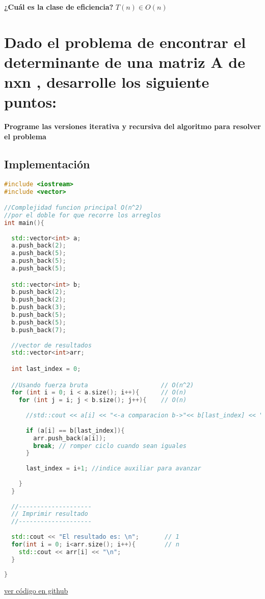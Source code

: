 \documentclass{article}
\begin{document}
\begin{question}
  \textbf{¿Cuál es la clase de eficiencia?}
  \textit{$T(n) \in O(n)$}
    
\end{question}

\newpage
\section{Dado el problema de encontrar el determinante de una matriz A de nxn , desarrolle los siguiente puntos:}

\begin{question}
  \textbf{Programe las versiones iterativa y recursiva del algoritmo para resolver el problema}
\end{question}

\subsection{Implementación}
\begin{file}
\begin{lstlisting}[language=C++]
#include <iostream>
#include <vector>

//Complejidad funcion principal O(n^2)
//por el doble for que recorre los arreglos
int main(){
  
  std::vector<int> a;
  a.push_back(2);
  a.push_back(5);
  a.push_back(5);
  a.push_back(5);

  std::vector<int> b;
  b.push_back(2);
  b.push_back(2);
  b.push_back(3);
  b.push_back(5);
  b.push_back(5);
  b.push_back(7);
  
  //vector de resultados
  std::vector<int>arr;

  int last_index = 0;

  //Usando fuerza bruta                    // O(n^2)
  for (int i = 0; i < a.size(); i++){      // O(n)
    for (int j = i; j < b.size(); j++){    // O(n)
      
      //std::cout << a[i] << "<-a comparacion b->"<< b[last_index] << "\n";
      
      if (a[i] == b[last_index]){
        arr.push_back(a[i]);
        break; // romper ciclo cuando sean iguales
      }
      
      last_index = i+1; //indice auxiliar para avanzar 
      
    }
  }
  
  //--------------------
  // Imprimir resultado
  //--------------------
  
  std::cout << "El resultado es: \n";       // 1
  for(int i = 0; i<arr.size(); i++){        // n
    std::cout << arr[i] << "\n";
  }
  
}

\end{lstlisting}
\end{file}
\href{https://github.com/luisballado/ADA/blob/main/practice_code/tarea1.cpp}{ver código en github}\\
\end{document}
